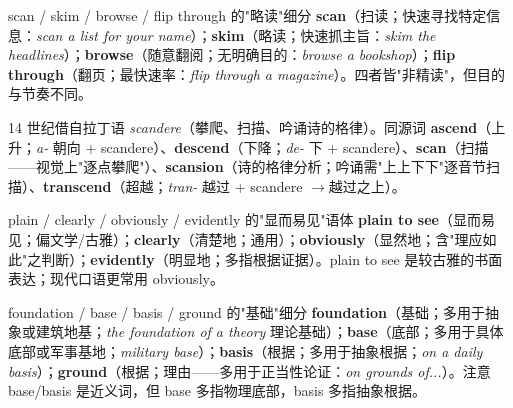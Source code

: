 \documentclass[../main.tex]{subfiles}
\begin{document}

\begin{lex}{scan / skim / browse / flip through 的"略读"细分}
\textbf{scan}（扫读；快速寻找特定信息：\textit{scan a list for your name}）；\textbf{skim}（略读；快速抓主旨：\textit{skim the headlines}）；\textbf{browse}（随意翻阅；无明确目的：\textit{browse a bookshop}）；\textbf{flip through}（翻页；最快速率：\textit{flip through a magazine}）。四者皆"非精读"，但目的与节奏不同。
\end{lex}

\begin{origin}
14 世纪借自拉丁语 \textit{scandere}（攀爬、扫描、吟诵诗的格律）。同源词 \textbf{ascend}（上升；\textit{a-} 朝向 + scandere）、\textbf{descend}（下降；\textit{de-} 下 + scandere）、\textbf{scan}（扫描——视觉上"逐点攀爬"）、\textbf{scansion}（诗的格律分析；吟诵需"上上下下"逐音节扫描）、\textbf{transcend}（超越；\textit{tran-} 越过 + scandere $\to$越过之上）。
\end{origin}



\begin{gram}{plain / clearly / obviously / evidently 的"显而易见"语体}
\textbf{plain to see}（显而易见；偏文学/古雅）；\textbf{clearly}（清楚地；通用）；\textbf{obviously}（显然地；含"理应如此"之判断）；\textbf{evidently}（明显地；多指根据证据）。plain to see 是较古雅的书面表达；现代口语更常用 obviously。
\end{gram}





\begin{gram}{foundation / base / basis / ground 的"基础"细分}
\textbf{foundation}（基础；多用于抽象或建筑地基；\textit{the foundation of a theory} 理论基础）；\textbf{base}（底部；多用于具体底部或军事基地；\textit{military base}）；\textbf{basis}（根据；多用于抽象根据；\textit{on a daily basis}）；\textbf{ground}（根据；理由——多用于正当性论证：\textit{on grounds of...}）。注意 base/basis 是近义词，但 base 多指物理底部，basis 多指抽象根据。
\end{gram}
\end{document}
